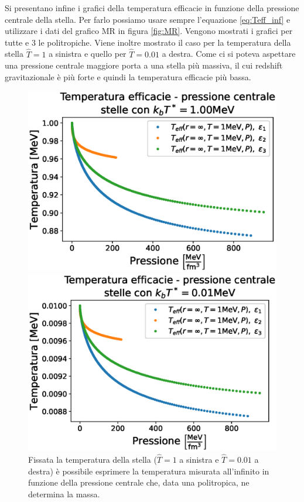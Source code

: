 \documentclass[a4paper, titlepage]{article}
\begin{document}
Si presentano infine i grafici della temperatura efficacie in funzione della
pressione centrale della stella.
Per farlo possiamo usare sempre l'equazione \ref{eq:Teff_inf} e utilizzare i
dati del grafico MR in figura \ref{fig:MR}.
Vengono mostrati i grafici per tutte e 3 le politropiche.
Viene inoltre mostrato il caso per la temperatura della stella $\hat T = 1$ a
sinistra e quello per $\hat T = 0.01$ a destra.
Come ci si poteva aspettare una pressione centrale maggiore porta a una stella
più massiva, il cui redshift gravitazionale è più forte e quindi la temperatura
efficacie più bassa.


\begin{figure}[h]
    \begin{minipage}{0.49 \textwidth}
        \centering
        \includegraphics[width = \textwidth]{Figures/Teff1.00_su_P.eps}
    \end{minipage}
    \begin{minipage}{0.49 \textwidth}
        \centering
        \includegraphics[width = \textwidth]{Figures/Teff0.01_su_P.eps}
    \end{minipage}
    \caption{Fissata la temperatura della stella ($\hat T = 1$ a sinistra e
    $\hat T = 0.01$ a destra) è possibile esprimere la temperatura misurata
    all'infinito in funzione della pressione centrale che, data una
    politropica, ne determina la massa.}
\end{figure}
\end{document}
